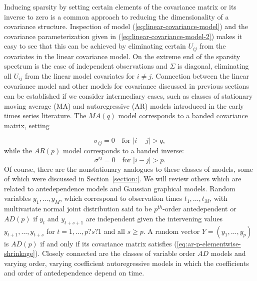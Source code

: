 \bigskip

Inducing sparsity by setting certain elements of the covariance matrix or its inverse to zero is a common approach to reducing the dimensionality of a covariance structure. Inspection of model (\ref{eq:linear-covariance-model}) and the covariance parameterization given in (\ref{eq:linear-covariance-model-2}) makes it easy to see that this can be achieved by eliminating certain $U_{ij}$ from the covariates in the linear covariance model. On the extreme end of the sparsity spectrum is the case of independent observations and $\Sigma$ is diagonal, eliminating all $U_{ij}$ from the linear model covariates for $i \ne j$. Connection between the linear covariance model and other models for covariance discussed in previous sections can be established if we consider intermediary cases, such as classes of stationary moving average (MA) and autoregressive (AR) models introduced in the early times series literature. The $MA(q)$ model corresponds to a banded covariance matrix, setting 

\begin{equation}  \label{eq:ar-p-elementwise-shrinkage}
\sigma_{ij} = 0 \quad \mbox{for }\vert i - j \vert > q, 
\end{equation}
\noindent
while the $AR(p)$ model corresponds to a banded inverse:
\begin{equation} \label{eq:ar-p-elementwise-shrinkage}
\sigma^{ij} = 0 \quad \mbox{for }\vert i - j \vert > p. 
\end{equation}
Of course, there are the nonstationary analogues to these classes of models, some of which were discussed in Section~\ref{section:}. We will review others which are related to antedependence models and Gaussian graphical models. Random variables $y_1, \dots, y_M$, which correspond to observation times $t_1,\dots, t_M$, with multivariate normal joint distribution said to be $p^{th}$-order antedependent or $AD(p)$ \cite{gabriel1962ante} if $y_t$ and $y_{t+s+1}$ are independent given the intervening values $y_{t+1}, \dots , y_{t+s}$ for $t = 1, \dots , p?s?1$ and all $s \ge p$. A random vector $Y = \left(y_1, \dots , y_p\right)$ is $AD(p)$ if and only if its covariance matrix satisfies (\ref{eq:ar-p-elementwise-shrinkage}). Closely connected are the classes of variable order $AD$ models and varying order, varying coefficient autoregressive models \cite{kitagawa1985smoothness} in which the coefficients and order of antedependence depend on time. 





